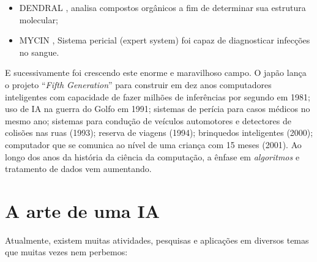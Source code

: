 \documentclass[
]{book}
\begin{document}
\begin{itemize}
\item
  DENDRAL \citep{buchanan1969heuristic}, analisa compostos orgânicos a fim de determinar sua estrutura molecular;
\item
  MYCIN \citep{buchanan1984rule}, Sistema pericial (expert system) foi capaz de diagnosticar infecções no sangue.
\end{itemize}

E sucessivamente foi crescendo este enorme e maravilhoso campo. O japão lança o projeto ``\emph{Fifth Generation}'' para construir em dez anos computadores inteligentes com capacidade de fazer milhões de inferências por segundo em 1981; uso de IA na guerra do Golfo em 1991; sistemas de perícia para casos médicos no mesmo ano; sistemas para condução de veículos automotores e detectores de colisões nas ruas (1993); reserva de viagens (1994); brinquedos inteligentes (2000); computador que se comunica ao nível de uma criança com 15 meses (2001). Ao longo dos anos da história da ciência da computação, a ênfase em \emph{algoritmos} e tratamento de dados vem aumentando.

\hypertarget{a-arte-de-uma-ia}{%
\section{A arte de uma IA}\label{a-arte-de-uma-ia}}

Atualmente, existem muitas atividades, pesquisas e aplicações em diversos temas que muitas vezes nem perbemos:
\end{document}
